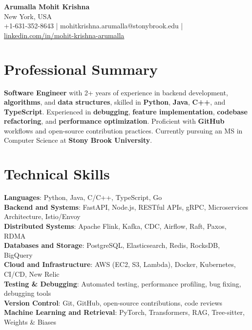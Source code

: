 \documentclass[letterpaper,11pt]{article}
\begin{document}
\begin{center}
  {\Large \textbf{Arumalla Mohit Krishna}} \\
  New York, USA \\
  +1-631-352-8643 \enspace | \enspace mohitkrishna.arumalla@stonybrook.edu \enspace | \enspace \href{https://www.linkedin.com/in/mohit-krishna-arumalla}{linkedin.com/in/mohit-krishna-arumalla}
\end{center}

\section{Professional Summary}
  \begin{itemize}[leftmargin=0.15in, label={}]
    \small{\item{
     \textbf{Software Engineer} with 2+ years of experience in backend development, \textbf{algorithms}, and \textbf{data structures}, skilled in \textbf{Python}, \textbf{Java}, \textbf{C++}, and \textbf{TypeScript}. Experienced in \textbf{debugging}, \textbf{feature implementation}, \textbf{codebase refactoring}, and \textbf{performance optimization}. Proficient with \textbf{GitHub} workflows and open-source contribution practices. Currently pursuing an MS in Computer Science at \textbf{Stony Brook University}.
    }}
  \end{itemize}
\vspace{-16pt}

\section{Technical Skills}
 \begin{itemize}[leftmargin=0.15in, label={}]
    \small{\item{
     \textbf{Languages}: Python, Java, C/C++, TypeScript, Go \\
     \textbf{Backend and Systems}: FastAPI, Node.js, RESTful APIs, gRPC, Microservices Architecture, Istio/Envoy \\
     \textbf{Distributed Systems}: Apache Flink, Kafka, CDC, Airflow, Raft, Paxos, RDMA \\
     \textbf{Databases and Storage}: PostgreSQL, Elasticsearch, Redis, RocksDB, BigQuery \\
     \textbf{Cloud and Infrastructure}: AWS (EC2, S3, Lambda), Docker, Kubernetes, CI/CD, New Relic \\
     \textbf{Testing \& Debugging}: Automated testing, performance profiling, bug fixing, debugging tools \\
     \textbf{Version Control}: Git, GitHub, open-source contributions, code reviews \\
     \textbf{Machine Learning and Retrieval}: PyTorch, Transformers, RAG, Tree-sitter, Weights \& Biases
    }}
 \end{itemize}
\vspace{-16pt}
\end{document}
